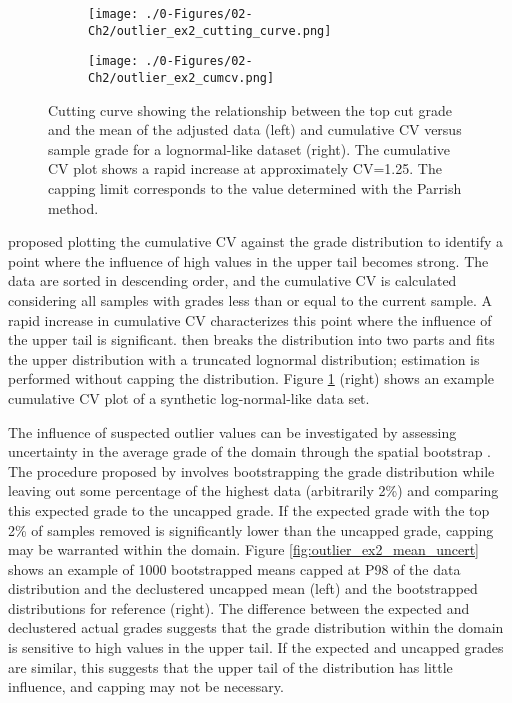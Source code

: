 \begin{figure}[!htb]
    \begin{subfigure}{0.5\textwidth}
        \centering
        \texttt{[image: ./0-Figures/02-Ch2/outlier\_ex2\_cutting\_curve.png]}
    \end{subfigure}
    \begin{subfigure}{0.5\textwidth}
        \centering
        \texttt{[image: ./0-Figures/02-Ch2/outlier\_ex2\_cumcv.png]}
    \end{subfigure}
    \caption{Cutting curve showing the relationship between the top cut grade and the mean of the adjusted data (left) and cumulative \gls{CV} versus sample grade for a lognormal-like dataset (right). The cumulative \gls{CV} plot shows a rapid increase at approximately CV=1.25. The capping limit corresponds to the value determined with the Parrish method.}
    \label{fig:cutting_cv}
\end{figure}

\cite{parker1991statistical} proposed plotting the cumulative \gls{CV} against the grade distribution to identify a point where the influence of high values in the upper tail becomes strong. The data are sorted in descending order, and the cumulative \gls{CV} is calculated considering all samples with grades less than or equal to the current sample. A rapid increase in cumulative \gls{CV} characterizes this point where the influence of the upper tail is significant. \cite{parker1991statistical} then breaks the distribution into two parts and fits the upper distribution with a truncated lognormal distribution; estimation is performed without capping the distribution. Figure \ref{fig:cutting_cv} (right) shows an example cumulative \gls{CV} plot of a synthetic log-normal-like data set.

The influence of suspected outlier values can be investigated by assessing uncertainty in the average grade of the domain through the spatial bootstrap \citep{solow1985bootstrapping}. The procedure proposed by \cite{nowak2013suggestions} involves bootstrapping the grade distribution while leaving out some percentage of the highest data (arbitrarily 2\%) and comparing this expected grade to the uncapped grade. If the expected grade with the top 2\% of samples removed is significantly lower than the uncapped grade, capping may be warranted within the domain. Figure \ref{fig:outlier_ex2_mean_uncert} shows an example of 1000 bootstrapped means capped at P98 of the data distribution and the declustered uncapped mean (left) and the bootstrapped distributions for reference (right). The difference between the expected and declustered actual grades suggests that the grade distribution within the domain is sensitive to high values in the upper tail. If the expected and uncapped grades are similar, this suggests that the upper tail of the distribution has little influence, and capping may not be necessary.

